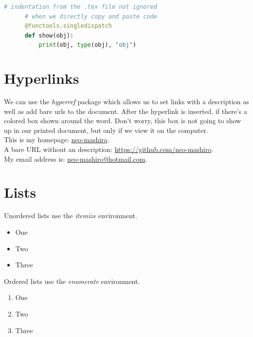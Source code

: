 \documentclass[11pt]{article}  %
\begin{document}
    \begin{lstlisting}[language=python]
      # indentation from the .tex file not ignored
      # when we directly copy and paste code
      @functools.singledispatch
      def show(obj):
          print(obj, type(obj), "obj")
    \end{lstlisting}



  \section{Hyperlinks}
    We can use the \textit{hyperref} package which allows us to set links with a description as well as add bare urls to the document. After the hyperlink is inserted, if there's a colored box shown around the word. Don't worry, this box is not going to show up in our printed document, but only if we view it on the computer.\\

    This is my homepage: \href{https://github.com/neo-mashiro}{neo-mashiro}.\\

    A bare URL without an description: \url{https://github.com/neo-mashiro}.\\

    My email address is: \href{mailto:neo-mashiro@hotmail.com}{neo-mashiro@hotmail.com}.


  \section{Lists}
    Unordered lists use the \textit{itemize} environment.

    \begin{itemize}
      \item One
      \item Two
      \item Three
    \end{itemize}

    \noindent Ordered lists use the \textit{enumerate} environment.

    \begin{enumerate}
      \item One
      \item Two
      \item Three
    \end{enumerate}
\end{document}
